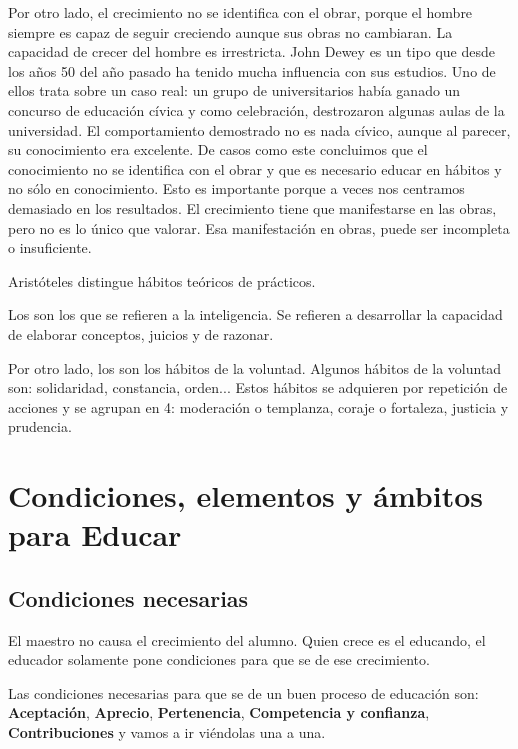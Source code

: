 \documentclass[palatino]{apuntesURJC}
\begin{document}
Por otro lado, el crecimiento no se identifica con el obrar, porque el hombre siempre es capaz de seguir creciendo aunque sus obras no cambiaran. 
%
La capacidad de crecer del hombre es irrestricta.\label{Capacidad_irrestricta}
%
John Dewey es un tipo que desde los años 50 del año pasado ha tenido mucha influencia con sus estudios.
%
Uno de ellos trata sobre un caso real: un grupo de universitarios había ganado un concurso de educación cívica y como celebración, destrozaron algunas aulas de la universidad.
% 
El comportamiento demostrado no es nada cívico, aunque al parecer, su conocimiento era excelente.
%
De casos como este concluimos que el conocimiento no se identifica con el obrar y que es necesario educar en hábitos y no sólo en conocimiento.
%
Esto es importante porque a veces nos centramos demasiado en los resultados.
%
El crecimiento tiene que manifestarse en las obras, pero no es lo único que valorar. Esa manifestación en obras, puede ser incompleta o insuficiente.


Aristóteles distingue hábitos teóricos de prácticos.

Los   son los que se refieren a la inteligencia. Se refieren a  desarrollar la capacidad de elaborar conceptos, juicios y de razonar. 

Por otro lado, los  son los hábitos de la voluntad.
%
Algunos hábitos de la voluntad son: solidaridad, constancia, orden... 
%
Estos hábitos se adquieren por repetición de acciones y se agrupan en 4: moderación o templanza, coraje o fortaleza, justicia y prudencia.





\chapter{Condiciones, elementos y ámbitos para Educar}

\section{Condiciones necesarias}

El maestro no causa el crecimiento del alumno. Quien crece es el educando, el educador solamente pone condiciones para que se de ese crecimiento.

Las condiciones necesarias para que se de un buen proceso de educación son:
\textbf{Aceptación}, \textbf{Aprecio}, \textbf{Pertenencia}, \textbf{Competencia y confianza}, \textbf{Contribuciones} y vamos a ir viéndolas una a una.
\end{document}
